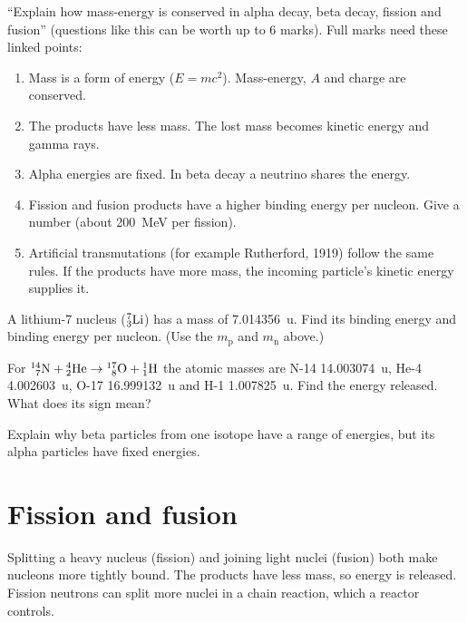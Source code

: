 \begin{examtip}
``Explain how mass-energy is conserved in alpha decay, beta decay, fission and
fusion'' (questions like this can be worth up to 6 marks). Full marks need these
linked points:
\begin{enumerate}
  \item Mass is a form of energy ($E = mc^2$). Mass-energy, $A$ and charge are conserved.
  \item The products have less mass. The lost mass becomes kinetic energy and gamma rays.
  \item Alpha energies are fixed. In beta decay a neutrino shares the energy.
  \item Fission and fusion products have a higher binding energy per nucleon. Give a
        number (about \qty{200}{MeV} per fission).
  \item Artificial transmutations (for example Rutherford, 1919) follow the same
        rules. If the products have more mass, the incoming particle's kinetic energy
        supplies it.
\end{enumerate}
\end{examtip}

\begin{quickcheck}
  \item A lithium-7 nucleus ($\chFourNuc{7}{3}{Li}$) has a mass of \qty{7.014356}{\amu}.
        Find its binding energy and binding energy per nucleon. (Use the $m_\mathrm{p}$
        and $m_\mathrm{n}$ above.)
  \item For $\chFourNuc{14}{7}{N} + \chFourAlpha \to \chFourNuc{17}{8}{O} + \chFourNuc{1}{1}{H}$
        the atomic masses are N-14 \qty{14.003074}{\amu}, He-4 \qty{4.002603}{\amu},
        O-17 \qty{16.999132}{\amu} and H-1 \qty{1.007825}{\amu}. Find the energy
        released. What does its sign mean?
  \item Explain why beta particles from one isotope have a range of energies, but its
        alpha particles have fixed energies.
\end{quickcheck}

\section{Fission and fusion}\label{ch4:sec:fission}

\begin{bigidea}
Splitting a heavy nucleus (fission) and joining light nuclei (fusion) both make
nucleons more tightly bound. The products have less mass, so energy is released.
Fission neutrons can split more nuclei in a chain reaction, which a reactor controls.
\end{bigidea}

